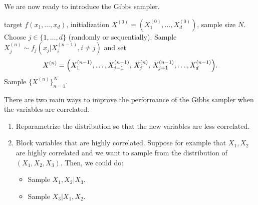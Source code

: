 We are now ready to introduce the Gibbs sampler.

\begin{algorithm}[H]
\caption{Gibbs Sampler}
\label{alg:5.1}
\begin{algorithmic}[1]
\Require target $f(x_1, \ldots, x_d)$, initialization
  $X^{(0)} = (X_1^{(0)}, \ldots, X_d^{(0)})$, sample size $N$.
  \State Choose $j \in \{1, \ldots, d\}$ (randomly or sequentially).
  \State Sample $X_j^{(n)} \sim f_j(x_j | X_i^{(n-1)}, i \neq j)$ and set
    \[
      X^{(n)} = \Bigl(X_1^{(n-1)}, \ldots, X_{j-1}^{(n-1)},\,
        X_j^{(n)},\, X_{j+1}^{(n-1)}, \ldots, X_d^{(n-1)}\Bigr).
    \]
\EndFor
\Ensure Sample $\{X^{(n)}\}_{n=1}^N$.
\end{algorithmic}
\end{algorithm}

\medskip
\noindent{}

\medskip

There are two main ways to improve the performance of the Gibbs sampler when the variables are
correlated.

\begin{enumerate}
  \item Reparametrize the distribution so that the new variables are less correlated.

  \item Block variables that are highly correlated. Suppose for example that $X_1, X_2$ are
    highly correlated and we want to sample from the distribution of $(X_1, X_2, X_3)$. Then,
    we could do:
    \begin{itemize}
      \item Sample $X_1, X_2 | X_3$.
      \item Sample $X_3 | X_1, X_2$.
    \end{itemize}
\end{enumerate}

